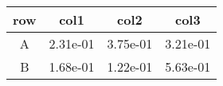 \begin{tabular}{cccc}
\toprule
row&col1&col2&col3\tabularnewline
\midrule
A&2.31e-01&3.75e-01&3.21e-01\tabularnewline
B&1.68e-01&1.22e-01&5.63e-01\tabularnewline
\bottomrule
\end{tabular}
